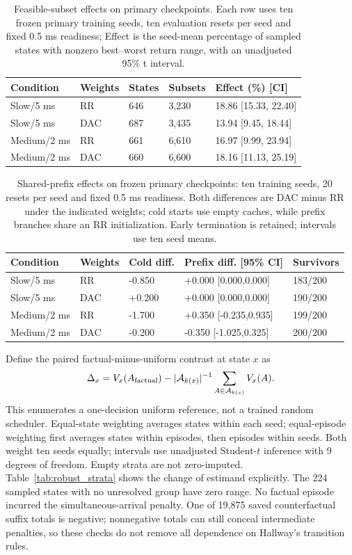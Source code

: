 \documentclass[pdflatex,sn-mathphys-num]{sn-jnl}
\begin{document}
\begin{table}[htbp]\centering\setlength{\tabcolsep}{1.3pt}\footnotesize
\caption{Feasible-subset effects on primary checkpoints. Each row uses ten frozen primary training seeds, ten evaluation resets per seed and fixed 0.5 ms readiness; Effect is the seed-mean percentage of sampled states with nonzero best--worst return range, with an unadjusted 95\% t interval.}\label{tab:new_fresh}
\vspace{3mm}
{\footnotesize\setlength{\tabcolsep}{1.3pt}\begin{tabular}{lllll}\toprule
Condition & Weights & States & Subsets & Effect (\%) [CI]\\\midrule
Slow/5 ms & RR & 646 & 3,230 & 18.86 [15.33, 22.40]\\
Slow/5 ms & DAC & 687 & 3,435 & 13.94 [9.45, 18.44]\\
Medium/2 ms & RR & 661 & 6,610 & 16.97 [9.99, 23.94]\\
Medium/2 ms & DAC & 660 & 6,600 & 18.16 [11.13, 25.19]\\
\bottomrule\end{tabular}}\end{table}
\begin{table}[htbp]\centering\setlength{\tabcolsep}{1.3pt}\footnotesize
\caption{Shared-prefix effects on frozen primary checkpoints: ten training seeds, 20 resets per seed and fixed 0.5 ms readiness. Both differences are DAC minus RR under the indicated weights; cold starts use empty caches, while prefix branches share an RR initialization. Early termination is retained; intervals use ten seed means.}\label{tab:new_prefix}
{\footnotesize\setlength{\tabcolsep}{1.3pt}\begin{tabular}{lllll}\toprule
Condition & Weights & Cold diff. & Prefix diff. [95\% CI] & Survivors\\\midrule
Slow/5 ms & RR & -0.850 & +0.000 [0.000,0.000] & 183/200\\
Slow/5 ms & DAC & +0.200 & +0.000 [0.000,0.000] & 190/200\\
Medium/2 ms & RR & -1.700 & +0.350 [-0.235,0.935] & 199/200\\
Medium/2 ms & DAC & -0.200 & -0.350 [-1.025,0.325] & 200/200\\
\bottomrule\end{tabular}}\end{table}
Define the paired factual-minus-uniform contrast at state $x$ as
\[
\Delta_x=V_x(A_{\rm factual})-|\mathcal A_{k(x)}|^{-1}\sum_{A\in\mathcal A_{k(x)}}V_x(A).
\]
This enumerates a one-decision uniform reference, not a trained random scheduler. Equal-state weighting averages states within each seed; equal-episode weighting first averages states within episodes, then episodes within seeds. Both weight ten seeds equally; intervals use unadjusted Student-$t$ inference with 9 degrees of freedom. Empty strata are not zero-imputed. Table~\ref{tab:robust_strata} shows the change of estimand explicitly. The 224 sampled states with no unresolved group have zero range. No factual episode incurred the simultaneous-arrival penalty. One of 19,875 saved counterfactual suffix totals is negative; nonnegative totals can still conceal intermediate penalties, so these checks do not remove all dependence on Hallway's transition rules.
\end{document}
